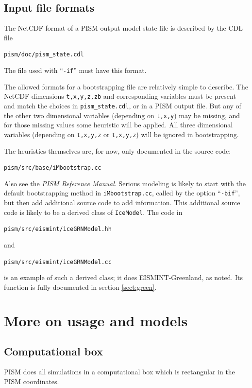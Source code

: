 \documentclass[11pt,final]{amsart}
\newcommand{\pismoptionindex}[1]{\index{options for PISM (and PETSc)!\texttt{-#1}}}
\newcommand{\intextoption}[1]{\texttt{-#1}\pismoptionindex{#1}}
\begin{document}
\subsection{Input file formats} The NetCDF format of a PISM output model state file is described by the CDL file
\begin{center}\verb|pism/doc/pism_state.cdl|\end{center}
\noindent The file used with ``\intextoption{if}'' must have this format.

The allowed formats for a bootstrapping file are relatively simple to describe.  The NetCDF dimensions \verb|t,x,y,z,zb| and corresponding variables must be present and match the choices in \verb|pism_state.cdl|, or in a PISM output file.  But any of the other two dimensional variables (depending on \verb|t,x,y|) may be missing, and for those missing values some heuristic will be applied.  All three dimensional variables (depending on \verb|t,x,y,z| or \verb|t,x,y,z|) will be ignored in bootstrapping.

The heuristics themselves are, for now, only documented in the source code:
\begin{center}\verb|pism/src/base/iMbootstrap.cc|\end{center}
\noindent Also see the \emph{PISM Reference Manual}.  Serious modeling is likely to start with the default bootstrapping method in \verb|iMbootstrap.cc|, called by the option ``\verb|-bif|'', but then add additional source code to add information.  This additional source code is likely to be a derived class of \verb|IceModel|.  The code in 
\begin{center}\verb|pism/src/eismint/iceGRNModel.hh|\end{center}
\noindent and
\begin{center}\verb|pism/src/eismint/iceGRNModel.cc|\end{center}
\noindent is an example of such a derived class; it does EISMINT-Greenland, as noted.  Its function is fully documented in section \ref{sect:green}.


\clearpage
\newpage
\section{More on usage and models}\label{sect:usage}

\subsection{Computational box} \label{subsect:coords} PISM does all simulations in a computational box which is rectangular in the PISM coordinates.
\end{document}
